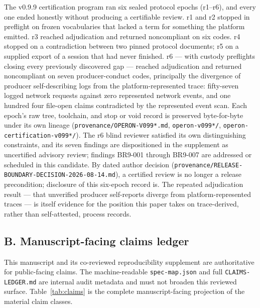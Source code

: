 \documentclass[11pt]{article}
\newcommand{\code}[1]{\texttt{#1}}
\begin{document}
The v0.9.9 certification program ran six sealed protocol epochs (r1--r6),
and every one ended honestly without producing a certifiable review. r1 and
r2 stopped in preflight on frozen vocabularies that lacked a term for
something the platform emitted. r3 reached adjudication and returned
noncompliant on six codes. r4 stopped on a contradiction between two pinned
protocol documents; r5 on a supplied export of a session that had never
finished. r6 — with custody preflights closing every previously discovered
gap — reached adjudication and returned noncompliant on seven
producer-conduct codes, principally the divergence of producer
self-describing logs from the platform-represented trace: fifty-seven logged
network requests against zero represented network events, and one hundred
four file-open claims contradicted by the represented event scan. Each
epoch's raw tree, toolchain, and stop or void record is preserved
byte-for-byte under its own lineage
(\code{provenance/OPERON-V099*\allowbreak.md},
\code{operon-v099*/}, \code{operon-certification-v099*/}). The r6 blind
reviewer satisfied its own distinguishing constraints, and its seven findings
are dispositioned in the supplement as uncertified advisory review; findings
BR9-001 through BR9-007 are addressed or scheduled in this candidate. By
dated author decision
(\code{provenance/RELEASE-BOUNDARY-DECISION-2026-08-14.md}), a certified
review is no longer a release precondition; disclosure of this six-epoch
record is. The repeated adjudication result — that unverified producer
self-reports diverge from platform-represented traces — is itself evidence
for the position this paper takes on trace-derived, rather than
self-attested, process records.

\subsection*{B. Manuscript-facing claims ledger}

This manuscript and its co-reviewed reproducibility supplement are
authoritative for public-facing claims. The machine-readable
\code{spec-map.json} and full \code{CLAIMS-LEDGER.md} are internal audit
metadata and must not broaden this reviewed surface. Table~\ref{tab:claims}
is the complete manuscript-facing projection of the material claim classes.
\end{document}
